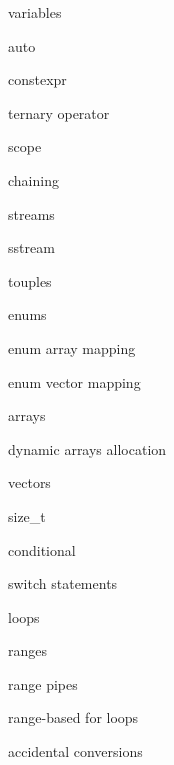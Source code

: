         variables

        auto
        
        constexpr 
        
         ternary operator
        
         scope
        
         chaining

         streams
        
         sstream 

         touples

         enums

         enum array mapping

         enum vector mapping

         arrays

         dynamic arrays allocation

         vectors

         size_t 

         conditional

         switch statements

         loops

         ranges

         range pipes

         range-based for loops

         accidental conversions
        
